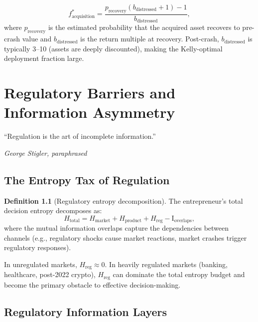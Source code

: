 \documentclass[12pt,a4paper,oneside]{book}
\theoremstyle{definition}
\newtheorem{definition}[theorem]{Definition}
\theoremstyle{remark}
\newcommand{\MI}{\mathrm{I}}
\begin{document}
\begin{equation}\label{eq:post_crash_kelly}
  f^*_{\text{acquisition}} = \frac{p_{\text{recovery}}(b_{\text{distressed}} + 1) - 1}
    {b_{\text{distressed}}},
\end{equation}
where $p_{\text{recovery}}$ is the estimated probability that the acquired asset
recovers to pre-crash value and $b_{\text{distressed}}$ is the return multiple at
recovery. Post-crash, $b_{\text{distressed}}$ is typically 3--10\texttimes{} (assets
are deeply discounted), making the Kelly-optimal deployment fraction large.

\chapter{Regulatory Barriers and Information Asymmetry}\label{ch:regulation}

\epigraph{``Regulation is the art of incomplete information.''}
{\textit{George Stigler, paraphrased}}

\section{The Entropy Tax of Regulation}

\begin{definition}[Regulatory entropy decomposition]
The entrepreneur's total decision entropy decomposes as:
\begin{equation}\label{eq:entropy_decomp}
  H_{\text{total}} = H_{\text{market}} + H_{\text{product}}
    + H_{\text{reg}} - \MI_{\text{overlaps}},
\end{equation}
where the mutual information overlaps capture the dependencies between channels (e.g.,
regulatory shocks cause market reactions, market crashes trigger regulatory responses).
\end{definition}

In unregulated markets, $H_{\text{reg}} \approx 0$. In heavily regulated markets
(banking, healthcare, post-2022 crypto), $H_{\text{reg}}$ can dominate the total
entropy budget and become the primary obstacle to effective decision-making.

\section{Regulatory Information Layers}
\end{document}
